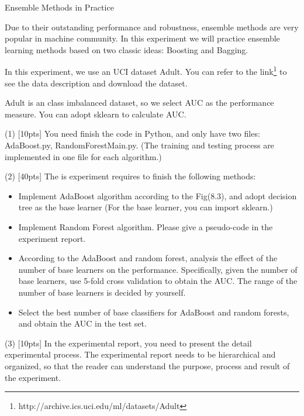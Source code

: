 \documentclass[11pt, a4paper, UTF8]{ctexart}
\begin{document}
\begin{problem}[ML problem 3]
	[60pts] Ensemble Methods in Practice
	
	Due to their outstanding performance and robustness, ensemble methods are very popular in machine community. In this experiment we will practice ensemble learning methods based on two classic
	ideas: Boosting and Bagging.
	
	In this experiment, we use an UCI dataset Adult. You can refer to the link\footnote{http://archive.ics.uci.edu/ml/datasets/Adult} to see the data description and download the dataset.
	
	Adult is an class imbalanced dataset, so we select AUC as the performance measure. You can adopt sklearn to calculate AUC.
	
(1) [10pts] You need finish the code in Python, and only have two files: AdaBoost.py, RandomForestMain.py. (The training and testing process are implemented in one file for each algorithm.)
	
(2) [40pts] The is experiment requires to finish the following methods:
	
		\begin{itemize}
			\item Implement AdaBoost algorithm according to the Fig(8.3), and adopt decision tree as the base learner (For the base learner, you can import sklearn.)
			\item  Implement Random Forest algorithm. Please give a pseudo-code in the experiment report.
			\item According to the AdaBoost and random forest, analysis the effect of the number of base learners on the performance. Specifically, given the number of base learners, use 5-fold cross validation to obtain the AUC. The range of the number of base learners is decided by yourself.
			\item Select the best number of base classifiers for AdaBoost and random forests, and obtain the AUC in the test set.
		\end{itemize}

(3) [10pts] In the experimental report, you need to present the detail experimental process. The experimental report needs to be hierarchical and organized, so that the reader can understand the purpose, process and result of the experiment.
		
\end{problem}
\end{document}

